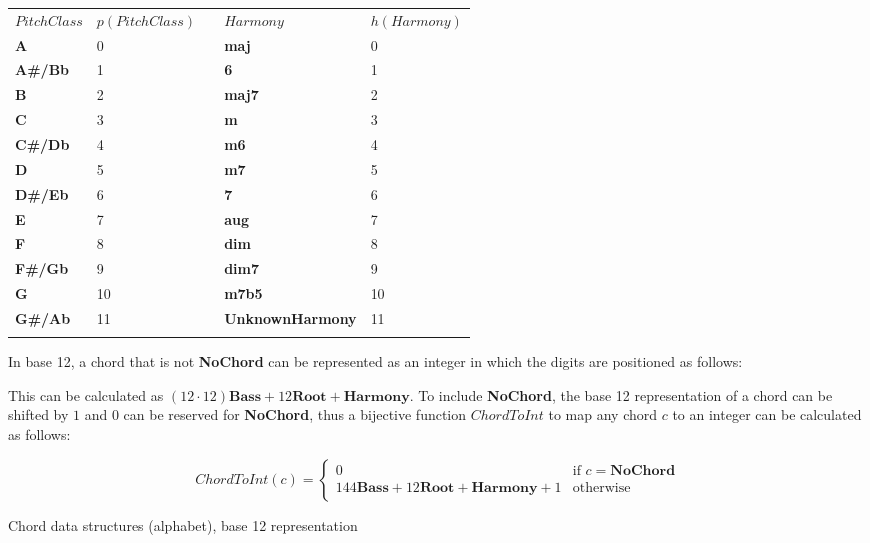 \begin{tabular}{llcll}
\toprule
$PitchClass$ & $p(PitchClass)$ & \hspace*{2cm} & $Harmony$ & $h(Harmony)$ \\
\cmidrule(r){1-2} \cmidrule(r){4-5}
\textbf{A}     & 0  & & \textbf{maj} & 0 \\
\textbf{A#/Bb} & 1  & & \textbf{6} & 1 \\
\textbf{B}     & 2  & & \textbf{maj7} & 2 \\
\textbf{C}     & 3  & & \textbf{m} & 3 \\
\textbf{C#/Db} & 4  & & \textbf{m6} & 4 \\
\textbf{D}     & 5  & & \textbf{m7} & 5 \\
\textbf{D#/Eb} & 6  & & \textbf{7} & 6 \\
\textbf{E}     & 7  & & \textbf{aug} & 7 \\
\textbf{F}     & 8  & & \textbf{dim} & 8 \\
\textbf{F#/Gb} & 9  & & \textbf{dim7} & 9 \\
\textbf{G}     & 10 & & \textbf{m7b5} & 10 \\
\textbf{G#/Ab} & 11 & & \textbf{UnknownHarmony} & 11 \\ \\
\end{tabular}

In base 12, a chord that is not \textbf{NoChord} can be represented as an integer in which the digits are positioned as follows:


This can be calculated as $(12 \cdot 12) \textbf{Bass} + 12 \textbf{Root} + \textbf{Harmony}$. To include \textbf{NoChord}, the base 12 representation of a chord can be shifted by $1$ and $0$ can be reserved for \textbf{NoChord}, thus a bijective function $ChordToInt$ to map any chord $c$ to an integer can be calculated as follows:

\[
ChordToInt(c) = 
\begin{cases}
0 & \text{if }c = \textbf{NoChord} \\
144 \textbf{Bass} + 12 \textbf{Root} + \textbf{Harmony} + 1 & \text{otherwise}
\end{cases}
\]

\item Chord data structures (alphabet), base 12 representation

